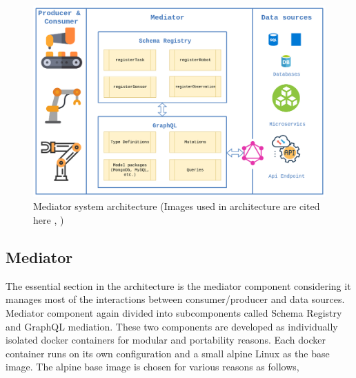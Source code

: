 	\begin{figure}[!htbp] 
		\begin{center}
			\includegraphics[scale=0.4]{./images/png/implementation/Architecture}	
			\caption{Mediator system architecture (Images used in architecture are cited here \cite{misc18} , \cite{misc17})}	
			\label{fig:architecture}	
		\end{center}
	\end{figure}
	
	
	\subsection{Mediator} 
	The essential section in the architecture is the mediator component considering it manages most of the interactions between consumer/producer and data sources. Mediator component again divided into subcomponents called Schema Registry and GraphQL mediation.  These two components are developed as individually isolated docker containers for modular and portability reasons. Each docker container runs on its own configuration and a small alpine Linux as the base image. The alpine base image is chosen for various reasons as follows, 
	
